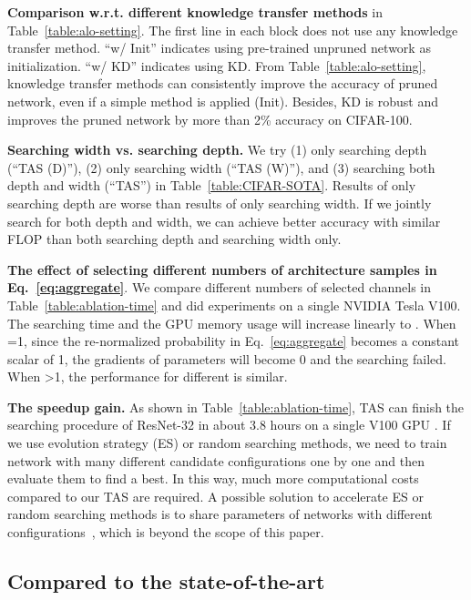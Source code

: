 \documentclass{article}
\def\Tabref#1{Table~\ref{#1}}
\def\Eqref#1{Eq.~\eqref{#1}}
\def\NAME{{TAS}}
\begin{document}
\textbf{Comparison w.r.t. different knowledge transfer methods} in \Tabref{table:alo-setting}.
The first line in each block does not use any knowledge transfer method.
``w/ Init'' indicates using pre-trained unpruned network as initialization.
``w/ KD'' indicates using KD.
From \Tabref{table:alo-setting}, knowledge transfer methods can consistently improve the accuracy of pruned network, even if a simple method is applied (Init). Besides, KD is robust and improves the pruned network by more than 2\% accuracy on CIFAR-100.

\textbf{Searching width vs. searching depth.}
We try (1) only searching depth (``{\NAME} (D)''), (2) only searching width (``{\NAME} (W)''), and (3) searching both depth and width (``{\NAME}'') in \Tabref{table:CIFAR-SOTA}.
Results of only searching depth are worse than results of only searching width.
If we jointly search for both depth and width, we can achieve better accuracy with similar FLOP than both searching depth and searching width only.


\textbf{The effect of selecting different numbers of architecture samples  in \Eqref{eq:aggregate}}.
We compare different numbers of selected channels in \Tabref{table:ablation-time} and did experiments on a single NVIDIA Tesla V100.
The searching time and the GPU memory usage will increase linearly to .
When =1, since the re-normalized probability in \Eqref{eq:aggregate} becomes a constant scalar of 1, the gradients of parameters  will become 0 and the searching failed.
When >1, the performance for different  is similar.


\textbf{The speedup gain.} As shown in \Tabref{table:ablation-time}, {\NAME} can finish the searching procedure of ResNet-32 in about 3.8 hours on a single V100 GPU . If we use evolution strategy (ES) or random searching methods, we need to train network with many different candidate configurations one by one and then evaluate them to find a best. In this way, much more computational costs compared to our {\NAME} are required.
A possible solution to accelerate ES or random searching methods is to share parameters of networks with different configurations~\cite{pham2018efficient,yu2019network}, which is beyond the scope of this paper.



\subsection{Compared to the state-of-the-art}\label{sec:exps-sota}
\end{document}
